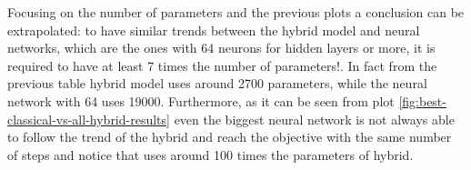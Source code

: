 \newline
\vspace{0.2 cm}
\newline
Focusing on the number of parameters and the previous plots a conclusion can be extrapolated: to have similar trends between the hybrid model and neural networks, which are the ones with 64 neurons for hidden layers or more, it is required to have at least 7 times the number of parameters!. In fact from the previous table hybrid model uses around 2700 parameters, while the neural network with 64 uses 19000. Furthermore, as it can be seen from plot \ref{fig:best-classical-vs-all-hybrid-results} even the biggest neural network is not always able to follow the trend of the hybrid and reach the objective with the same number of steps and notice that uses around 100 times the parameters of hybrid.